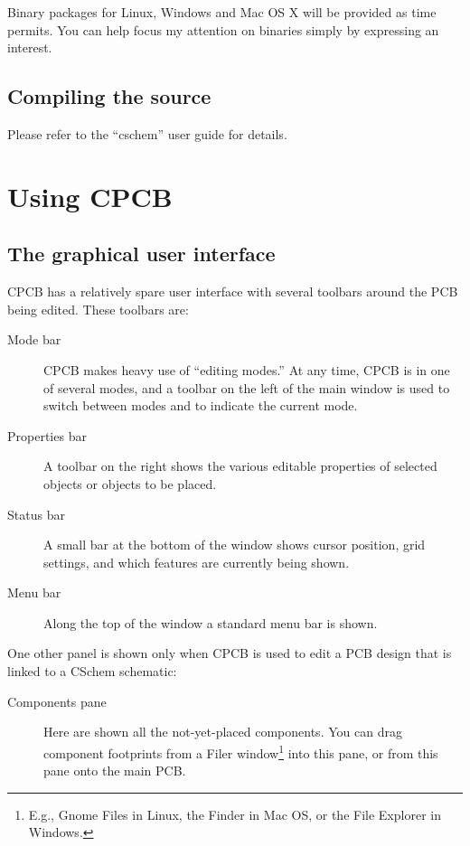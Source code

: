 \documentclass[11pt]{report}
\begin{document}
Binary packages for Linux, Windows and Mac OS X will be provided as time
permits. You can help focus my attention on binaries simply by
expressing an interest.



\section{Compiling the source}

Please refer to the ``cschem'' user guide for details.

\chapter{Using CPCB}\label{ch.using}

\section{The graphical user interface}

CPCB has a relatively spare user interface with several toolbars
around the PCB being edited. These toolbars are:
\begin{description}
  \item[Mode bar] CPCB makes heavy use of
``editing modes.'' At any time, CPCB is in one of several modes, and a
toolbar on the left of the main window is used to switch between modes
and to indicate the current mode.
\item[Properties bar]  A toolbar on the right shows the various
  editable properties of
  selected objects or objects to be placed.
\item[Status bar] A small  bar at the bottom of the window shows cursor
  position, grid settings, and which features are currently being shown.
\item[Menu bar]Along the top of the window a standard menu bar is
  shown.
\end{description}
One other panel is shown only  when CPCB is used to edit a PCB design that
is linked to a CSchem schematic:
\begin{description}
  \item[Components pane] Here are shown all the not-yet-placed
    components. You can drag component footprints from a Filer
    window\footnote{E.g., Gnome Files in Linux, the Finder
        in Mac OS, or the File Explorer in Windows.} into this pane,
      or from this pane onto the main PCB.
\end{description}
\end{document}
